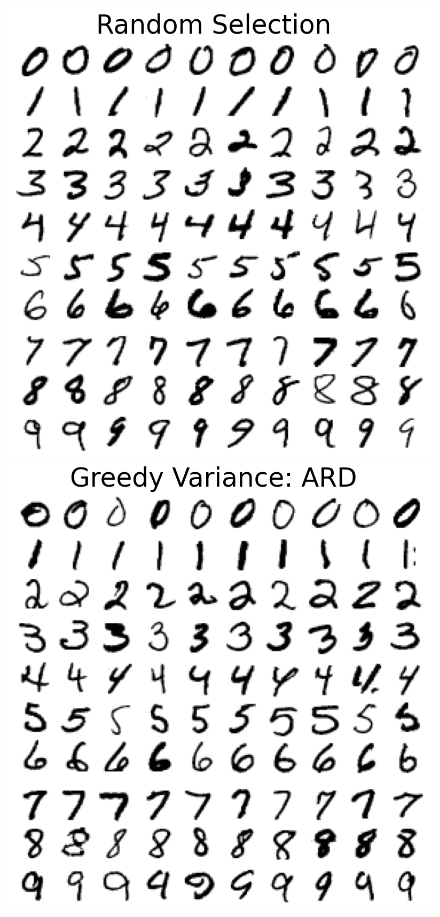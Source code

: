 \documentclass{article}
\numberwithin{equation}{section}
\begin{document}
\begin{figure}[h!]
\centering
\begin{minipage}{.25\textwidth}
  \centering
  \includegraphics[width=\linewidth]{thesis-report/figures/mnist_inducing_point/random_mnist_inducing_point_selection.png}
\end{minipage}%
\begin{minipage}{.25\textwidth}
  \centering
  \includegraphics[width=\linewidth]{thesis-report/figures/mnist_inducing_point/greedy_mnist_ard_inducing_point_selection.png}

\end{minipage}
\end{figure}
\end{document}
